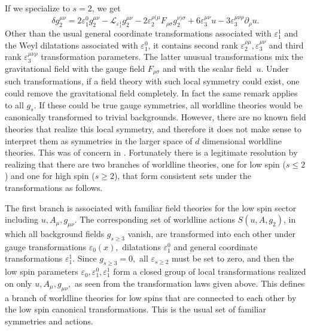 \documentclass[a4paper,12pt]{article}
\begin{document}
If we specialize to $s=2$, we get
\begin{equation}
\delta g_{2}^{\mu \nu }=2\varepsilon _{1}^{0}g_{2}^{\mu \nu }-\mathcal{L}%
_{\varepsilon _{1}^{1}}g_{2}^{\mu \nu }-2\varepsilon _{2}^{\rho (\mu
}F_{\rho \sigma }g_{2}^{\nu )\sigma }+6\varepsilon _{3}^{\mu \nu
}u-3\varepsilon _{3}^{\mu \nu \rho }\partial _{\rho }u.
\end{equation}
Other than the usual general coordinate transformations associated with $%
\varepsilon _{1}^{1}$ and the Weyl dilatations associated with $\varepsilon
_{1}^{0}$, it contains second rank $\varepsilon _{2}^{\rho \mu },\varepsilon
_{3}^{\mu \nu }$ and third rank $\varepsilon _{3}^{\mu \nu \rho }$
transformation parameters. The latter unusual transformations mix the
gravitational field with the gauge field $F_{\rho \sigma }$ and with the
scalar field $\ u.$ Under such transformations, if a field theory with such
local symmetry could exist, one could remove the gravitational field
completely. In fact the same remark applies to all $g_{s}.$ If these could
be true gauge symmetries, all worldline theories would be canonically
transformed to trivial backgrounds. However, there are no known field
theories that realize this local symmetry, and therefore it does not make
sense to interpret them as symmetries in the larger space of $d$ dimensional
worldline theories. This was of concern in \cite{segal}. Fortunately there
is a legitimate resolution by realizing that there are two branches of
worldline theories, one for low spin ($s\leq 2$) and one for high spin ($%
s\geq 2$), that form consistent sets under the transformations as follows.

The first branch is associated with familiar field theories for the low spin
sector including $u,A_{\mu },g_{\mu \nu }.$ The corresponding set of
worldline actions $S(u,A,g_{2})$, in which all background fields $g_{s\geq
3} $ vanish, are transformed into each other under gauge transformations $%
\varepsilon _{0}\left( x\right) ,$ dilatations $\varepsilon _{1}^{0}$ and
general coordinate transformations $\varepsilon _{1}^{1}$. Since $g_{s\geq
3}=0,$ all $\varepsilon _{s\geq 2}$ must be set to zero, and then the low
spin parameters $\varepsilon _{0},\varepsilon _{1}^{0},\varepsilon _{1}^{1}$
form a closed group of local transformations realized on only $u,A_{\mu
},g_{\mu \nu },$ as seen from the transformation laws given above. This
defines a branch of worldline theories for low spins that are connected to
each other by the low spin canonical transformations. This is the usual set
of familiar symmetries and actions.
\end{document}
